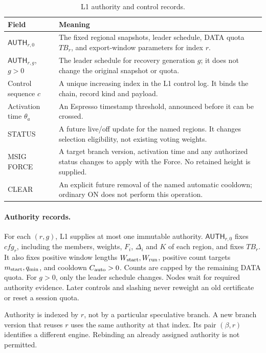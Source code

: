\documentclass[11pt,a4paper]{article}
\newcommand{\TB}{\mathit{TB}}
\newcommand{\tagg}[1]{\ensuremath{\mathsf{#1}}}
\begin{document}
\begin{table}[htbp]\centering\small
\caption{L1 authority and control records.}\label{tab:l1}
\begin{tabularx}{\linewidth}{@{}p{.27\linewidth}Y@{}}\toprule
Field & Meaning\\\midrule
$\tagg{AUTH}_{r,0}$ & The fixed regional snapshots, leader schedule,
DATA quota $\TB_r$, and export-window parameters for index $r$.\\
$\tagg{AUTH}_{r,g}$, $g>0$ & The leader schedule for recovery
generation $g$; it does not change the original snapshot or quota.\\
Control sequence $c$ & A unique increasing index in the L1 control
log. It binds the chain, record kind and payload.\\
Activation time $\theta_a$ & An Espresso timestamp threshold,
announced before it can be crossed.\\
STATUS & A future live/off update for the named regions. It changes
selection eligibility, not existing voting weights.\\
MSIG FORCE & A target branch version, activation time and any authorized
status changes to apply with the Force. No retained height is supplied.\\
CLEAR & An explicit future removal of the named automatic cooldown;
ordinary ON does not perform this operation.\\\bottomrule
\end{tabularx}
\end{table}

\paragraph{Authority records.}
For each $(r,g)$, L1 supplies at most one immutable authority.
$\tagg{AUTH}_{r,0}$ fixes $\mathit{cfg}_r$, including the members,
weights, $F_i$, $\Delta_i$ and $K$ of each region, and fixes $\TB_r$.
It also fixes positive window lengths $W_{\rm start},W_{\rm run}$,
positive count targets $m_{\rm start},q_{\min}$, and cooldown
$C_{\rm auto}>0$. Counts are capped by the remaining DATA quota.
For $g>0$, only the leader schedule changes.
Nodes wait for required authority evidence. Later controls and slashing
never reweight an old certificate or reset a session quota.

Authority is indexed by $r$, not by a particular speculative branch.
A new branch version that reuses $r$ uses the same authority at that index.
Its pair $(\beta,r)$ identifies a different engine. Rebinding an already
assigned authority is not permitted.
\end{document}
